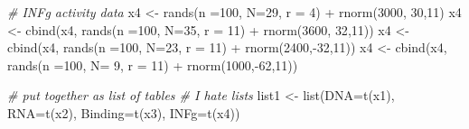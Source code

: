 \documentclass[
]{article}
\newenvironment{Shaded}{\begin{snugshade}}{\end{snugshade}}
\newcommand{\AttributeTok}[1]{\textcolor[rgb]{0.77,0.63,0.00}{#1}}
\newcommand{\CommentTok}[1]{\textcolor[rgb]{0.56,0.35,0.01}{\textit{#1}}}
\newcommand{\DecValTok}[1]{\textcolor[rgb]{0.00,0.00,0.81}{#1}}
\newcommand{\FunctionTok}[1]{\textcolor[rgb]{0.00,0.00,0.00}{#1}}
\newcommand{\NormalTok}[1]{#1}
\newcommand{\OtherTok}[1]{\textcolor[rgb]{0.56,0.35,0.01}{#1}}
\newcommand{\SpecialCharTok}[1]{\textcolor[rgb]{0.00,0.00,0.00}{#1}}
\begin{document}
\begin{Shaded}
\begin{Highlighting}[]
\CommentTok{\# INFg activity data}
\NormalTok{x4 }\OtherTok{\textless{}{-}}           \FunctionTok{rands}\NormalTok{(}\AttributeTok{n =}\DecValTok{100}\NormalTok{, }\AttributeTok{N=}\DecValTok{29}\NormalTok{, }\AttributeTok{r =}  \DecValTok{4}\NormalTok{) }\SpecialCharTok{+} \FunctionTok{rnorm}\NormalTok{(}\DecValTok{3000}\NormalTok{, }\DecValTok{30}\NormalTok{,}\DecValTok{11}\NormalTok{)}
\NormalTok{x4 }\OtherTok{\textless{}{-}} \FunctionTok{cbind}\NormalTok{(x4, }\FunctionTok{rands}\NormalTok{(}\AttributeTok{n =}\DecValTok{100}\NormalTok{, }\AttributeTok{N=}\DecValTok{35}\NormalTok{, }\AttributeTok{r =} \DecValTok{11}\NormalTok{) }\SpecialCharTok{+} \FunctionTok{rnorm}\NormalTok{(}\DecValTok{3600}\NormalTok{, }\DecValTok{32}\NormalTok{,}\DecValTok{11}\NormalTok{))}
\NormalTok{x4 }\OtherTok{\textless{}{-}} \FunctionTok{cbind}\NormalTok{(x4, }\FunctionTok{rands}\NormalTok{(}\AttributeTok{n =}\DecValTok{100}\NormalTok{, }\AttributeTok{N=}\DecValTok{23}\NormalTok{, }\AttributeTok{r =} \DecValTok{11}\NormalTok{) }\SpecialCharTok{+} \FunctionTok{rnorm}\NormalTok{(}\DecValTok{2400}\NormalTok{,}\SpecialCharTok{{-}}\DecValTok{32}\NormalTok{,}\DecValTok{11}\NormalTok{))}
\NormalTok{x4 }\OtherTok{\textless{}{-}} \FunctionTok{cbind}\NormalTok{(x4, }\FunctionTok{rands}\NormalTok{(}\AttributeTok{n =}\DecValTok{100}\NormalTok{, }\AttributeTok{N=} \DecValTok{9}\NormalTok{, }\AttributeTok{r =} \DecValTok{11}\NormalTok{) }\SpecialCharTok{+} \FunctionTok{rnorm}\NormalTok{(}\DecValTok{1000}\NormalTok{,}\SpecialCharTok{{-}}\DecValTok{62}\NormalTok{,}\DecValTok{11}\NormalTok{))}

\CommentTok{\# put together as list of tables \# I hate lists}
\NormalTok{list1 }\OtherTok{\textless{}{-}} \FunctionTok{list}\NormalTok{(}\AttributeTok{DNA=}\FunctionTok{t}\NormalTok{(x1), }\AttributeTok{RNA=}\FunctionTok{t}\NormalTok{(x2), }\AttributeTok{Binding=}\FunctionTok{t}\NormalTok{(x3), }\AttributeTok{INFg=}\FunctionTok{t}\NormalTok{(x4))}


\end{Highlighting}
\end{Shaded}
\end{document}
